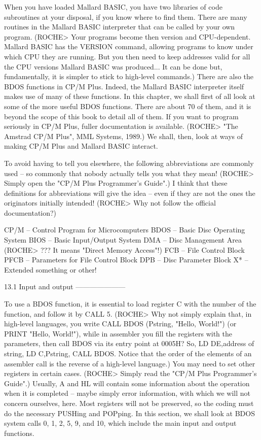 When you have loaded Mallard BASIC, you have two libraries of code subroutines 
at  your disposal, if you know where to find them. There are many routines  in 
the Mallard BASIC interpreter that can be called by your own program.  (ROCHE> 
Your  programs  become then version and CPU-dependent. Mallard BASIC  has  the 
VERSION  command, allowing programs to know under which CPU they are  running. 
But  you  then need to keep addresses valid for all the CPU  versions  Mallard 
BASIC  was  produced... It can be done but, fundamentally, it  is  simpler  to 
stick to high-level commands.) There are also the BDOS functions in CP/M Plus. 
Indeed,  the  Mallard  BASIC interpreter itself makes use  of  many  of  these 
functions.  In  this chapter, we shall first of all look at some of  the  more 
useful BDOS functions. There are about 70 of them, and it is beyond the  scope 
of  this book to detail all of them. If you want to program seriously in  CP/M 
Plus, fuller documentation is available. (ROCHE> "The Amstrad CP/M Plus",  MML 
Systems,  1989.) We shall, then, look at ways of making CP/M Plus and  Mallard 
BASIC interact.

To  avoid  having  to  tell you elsewhere,  the  following  abbreviations  are 
commonly  used -- so commonly that nobody actually tells you what  they  mean! 
(ROCHE>  Simply open the "CP/M Plus Programmer's Guide".) I think  that  these 
definitions  for abbreviations will give the idea -- even if they are not  the 
ones  the originators initially intended! (ROCHE> Why not follow the  official 
documentation?)

        CP/M -- Control Program for Microcomputers
        BDOS -- Basic Disc Operating System
        BIOS -- Basic Input/Output System
        DMA  -- Disc Management Area
                (ROCHE> ??? It means "Direct Memory Access"!)
        FCB  -- File Control Block
        PFCB -- Parameters for File Control Block
        DPB  -- Disc Parameter Block
        X*   -- Extended something or other!


13.1 Input and output
---------------------

To use a BDOS function, it is essential to load register C with the number  of 
the function, and follow it by CALL 5. (ROCHE> Why not simply explain that, in 
high-level languages, you write CALL BDOS (Pstring, "Hello, World!") (or PRINT 
"Hello,  World!"),  while  in  assembler  you  fill  the  registers  with  the 
parameters, then call BDOS via its entry point at 0005H? So, LD DE,address  of 
string,  LD C,Pstring, CALL BDOS. Notice that the order of the elements of  an 
assembler  call is the reverse of a high-level language.) You may need to  set 
other  registers  in  certain  cases.  (ROCHE>  Simply  read  the  "CP/M  Plus 
Programmer's  Guide".) Usually, A and HL will contain some  information  about 
the  operation  when it is completed -- maybe simply error  information,  with 
which  we  will  not  concern ourselves, here.  Most  registers  will  not  be 
preserved,  so the coding must do the necessary PUSHing and POPping.  In  this 
section,  we  shall  look at BDOS system calls 0, 1, 2, 5, 9,  and  10,  which 
include the main input and output functions.

